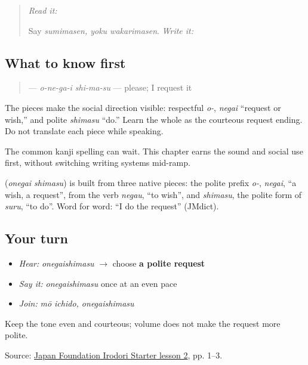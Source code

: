 \label{lesson:JA-C09-onegaishimasu}



\begin{quote}
\emph{Read it:} \textbf{}

Say \emph{sumimasen, yoku wakarimasen}. \emph{Write it:} \textbf{}
\end{quote}

\subsection*{What to know first}
\begin{quote}
\textbf{} — \emph{o-ne-ga-i shi-ma-su} — please; I request it
\end{quote}

The pieces make the social direction visible: respectful \emph{o-}, \emph{negai} “request or wish,” and polite \emph{shimasu} “do.” Learn the whole as the courteous request ending. Do not translate each piece while speaking.

The common kanji spelling can wait. This chapter earns the sound and social use first, without switching writing systems mid-ramp.

\begin{cousinweb}
\textbf{} (\emph{onegai shimasu}) is built from three native pieces: the polite prefix \emph{o-}, \emph{negai}, \textquotedblleft{}a wish, a request\textquotedblright{}, from the verb \emph{negau}, \textquotedblleft{}to wish\textquotedblright{}, and \emph{shimasu}, the polite form of \emph{suru}, \textquotedblleft{}to do\textquotedblright{}. Word for word: \textquotedblleft{}I do the request\textquotedblright{} (JMdict).
\end{cousinweb}

\subsection*{Your turn}
\begin{itemize}
\raggedright
  \item \emph{Hear:} \emph{onegaishimasu} $\to$ choose \textbf{a polite request}
  \item \emph{Say it:} \emph{onegaishimasu} once at an even pace
  \item \emph{Join:} \emph{mō ichido, onegaishimasu}
\end{itemize}

\begin{tcolorbox}[breakable,colback=teal!4,colframe=teal!35!black,title={Before you move on}]
Keep the tone even and courteous; volume does not make the request more polite.

Source: \href{https://www.irodori.jpf.go.jp/assets/data/starter/pdf/X\_L02.pdf}{Japan Foundation Irodori Starter lesson 2}, pp. 1–3.
\end{tcolorbox}
